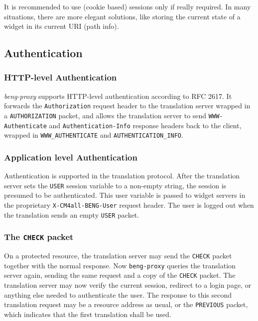 \documentclass[a4paper,12pt]{article}
\begin{document}
It is recommended to use (cookie based) sessions only if really
required.  In many situations, there are more elegant solutions, like
storing the current state of a widget in its current URI (path info).

\subsection{Authentication}
\label{authentication}

\subsubsection{HTTP-level Authentication}

\emph{beng-proxy} supports HTTP-level authentication according to RFC
2617.  It forwards the \texttt{Authorization} request header to the
translation server wrapped in a \verb|AUTHORIZATION| packet, and
allows the translation server to send \texttt{WWW-Authenticate} and
\texttt{Authentication-Info} response headers back to the client,
wrapped in \verb|WWW_AUTHENTICATE| and \verb|AUTHENTICATION_INFO|.

\subsubsection{Application level Authentication}

Authentication is supported in the translation protocol.  After the
translation server sets the \verb|USER| session variable to a
non-empty string, the session is presumed to be authenticated.  This
user variable is passed to widget servers in the proprietary
\texttt{X-CM4all-BENG-User} request header.  The user is logged out
when the translation sends an empty \verb|USER| packet.

\subsubsection{The \texttt{CHECK} packet}

On a protected resource, the translation server may send the
\verb|CHECK| packet together with the normal response.  Now
\texttt{beng-proxy} queries the translation server again, sending the
same request and a copy of the \verb|CHECK| packet.  The translation
server may now verify the current session, redirect to a login page,
or anything else needed to authenticate the user.  The response to
this second translation request may be a resource address as usual, or
the \verb|PREVIOUS| packet, which indicates that the first
translation shall be used.
\end{document}
